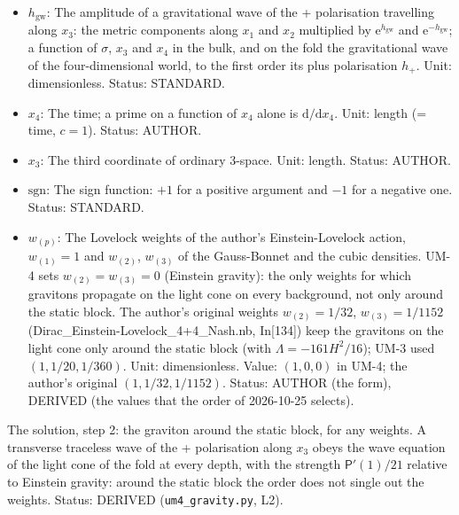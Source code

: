 \documentclass[
  10pt,
]{article}
\begin{document}
\begin{itemize}
  dimensions or of the fold). Status: STANDARD.
\item
  \(h_{\mathrm{gw}}\): The amplitude of a gravitational wave of the +
  polarisation travelling along \(x_3\): the metric components along
  \(x_1\) and \(x_2\) multiplied by \(\mathrm{e}^{h_{\mathrm{gw}}}\) and
  \(\mathrm{e}^{-h_{\mathrm{gw}}}\); a function of \(\sigma\), \(x_3\)
  and \(x_4\) in the bulk, and on the fold the gravitational wave of the
  four-dimensional world, to the first order its plus polarisation
  \(h_{+}\). Unit: dimensionless. Status: STANDARD.
\item
  \(x_4\): The time; a prime on a function of \(x_4\) alone is
  \(\mathrm{d}/\mathrm{d}x_4\). Unit: length (= time, \(c = 1\)).
  Status: AUTHOR.
\item
  \(x_3\): The third coordinate of ordinary 3-space. Unit: length.
  Status: AUTHOR.
\item
  \(\mathrm{sgn}\): The sign function: \(+1\) for a positive argument
  and \(-1\) for a negative one. Status: STANDARD.
\item
  \(w_{(p)}\): The Lovelock weights of the author's Einstein-Lovelock
  action, \(w_{(1)} = 1\) and \(w_{(2)}\), \(w_{(3)}\) of the
  Gauss-Bonnet and the cubic densities. UM-4 sets
  \(w_{(2)} = w_{(3)} = 0\) (Einstein gravity): the only weights for
  which gravitons propagate on the light cone on every background, not
  only around the static block. The author's original weights
  \(w_{(2)} = 1/32\), \(w_{(3)} = 1/1152\)
  (Dirac\_Einstein-Lovelock\_4+4\_Nash.nb, In{[}134{]}) keep the
  gravitons on the light cone only around the static block (with
  \(\Lambda = -161H^2/16\)); UM-3 used \((1, 1/20, 1/360)\). Unit:
  dimensionless. Value: \((1, 0, 0)\) in UM-4; the author's original
  \((1, 1/32, 1/1152)\). Status: AUTHOR (the form), DERIVED (the values
  that the order of 2026-10-25 selects).
\end{itemize}

The solution, step 2: the graviton around the static block, for any
weights. A transverse traceless wave of the + polarisation along \(x_3\)
obeys the wave equation of the light cone of the fold at every depth,
with the strength \(\mathsf{P}'(1)/21\) relative to Einstein gravity:
around the static block the order does not single out the weights.
Status: DERIVED (\texttt{um4\_gravity.py}, L2).
\end{document}
